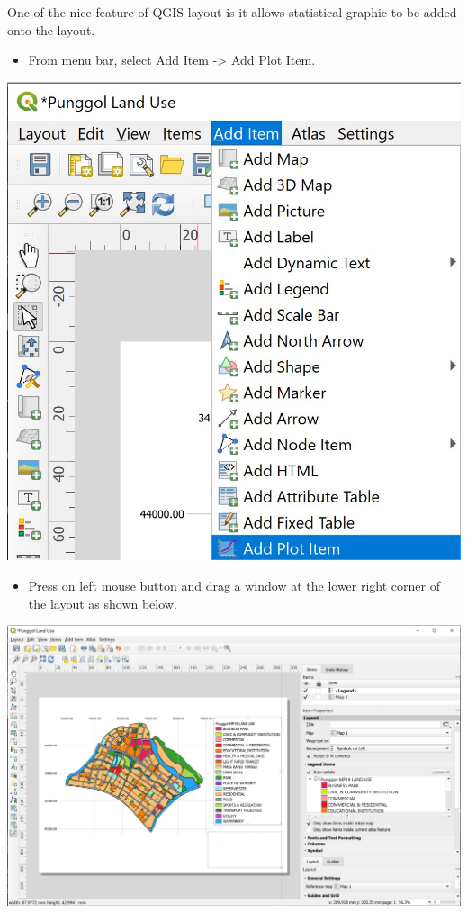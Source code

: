 \documentclass[
  letterpaper,
  DIV=11,
  numbers=noendperiod]{scrreprt}
\providecommand{\tightlist}{%
  \setlength{\itemsep}{0pt}\setlength{\parskip}{0pt}}\usepackage{longtable,booktabs,array}
\begin{document}
One of the nice feature of QGIS layout is it allows statistical graphic
to be added onto the layout.

\begin{itemize}
\tightlist
\item
  From menu bar, select Add Item -\textgreater{} Add Plot Item.
\end{itemize}

\includegraphics{./img04/image66.jpg}

\begin{itemize}
\tightlist
\item
  Press on left mouse button and drag a window at the lower right corner
  of the layout as shown below.
\end{itemize}

\includegraphics{./img04/image67.jpg}
\end{document}
